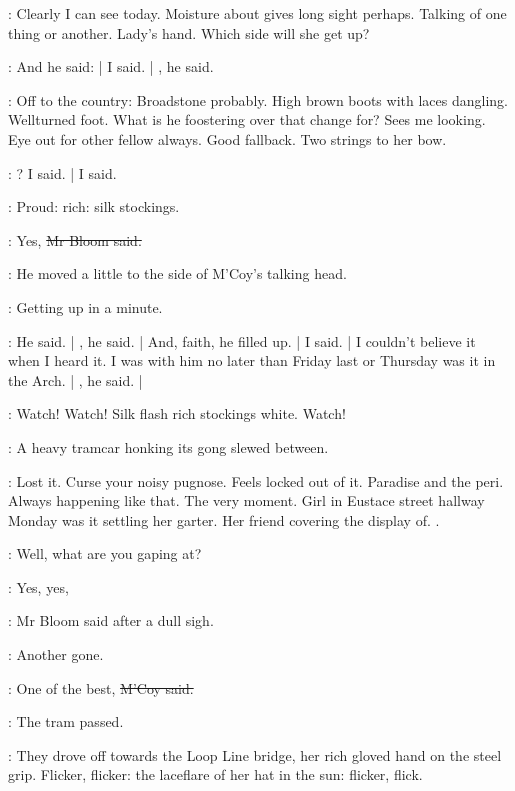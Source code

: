 \BloomInt:
Clearly I can see today.
Moisture about gives long sight perhaps.
Talking of one thing or another.
Lady's hand.
Which side will she get up?

\mccoy:
And he said:  |
 I said. |
, he said.

\BloomInt:
Off to the country:
Broadstone probably.
High brown boots with laces dangling.
Wellturned foot.
What is he foostering over that change for?
Sees me looking.
Eye out for other fellow always.
Good fallback.
Two strings to her bow.

\mccoy:
? I said. |
 I said.

\BloomInt:
Proud:
rich:
silk stockings.

\Bloom:
Yes,
\sout{Mr Bloom said.}

:
He moved a little to the side of M'Coy's talking head.

\BloomInt:
Getting up in a minute.

\mccoy:
 He said. |
, he said. |
And, faith, he filled up. |
 I said. |
I couldn't believe it when I heard it.
I was with him no later than Friday last
or Thursday was it
in the Arch. |
, he said. |

\BloomInt:
Watch!
Watch!
Silk flash rich stockings white.
Watch!

:
A heavy tramcar honking its gong
slewed between.

\BloomInt:
Lost it.
Curse your noisy pugnose.
Feels locked out of it.
Paradise and the peri.
Always happening like that.
The very moment.
Girl in Eustace street hallway
Monday was it
settling her garter.
Her friend covering the display of.
.

\friend:
Well, what are you gaping at?

\Bloom:
Yes, yes,

:
Mr Bloom said after a dull sigh.

\Bloom:
Another gone.

\mccoy:
One of the best,
\sout{M'Coy said.}

:
The tram passed.

:
They drove off towards the Loop Line bridge,
her rich gloved hand on the steel grip.
Flicker, flicker:
the laceflare of her hat in the sun:
flicker, flick.

